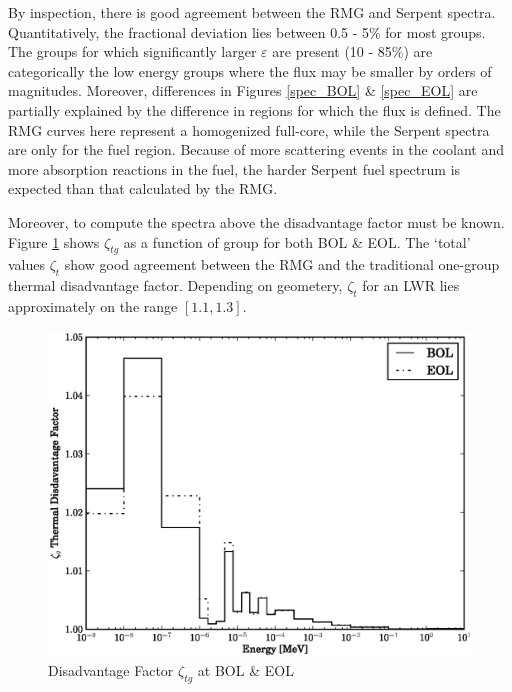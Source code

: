 By inspection, there is good agreement between the RMG and Serpent spectra.  Quantitatively, 
the fractional deviation lies between 0.5 - 5\% for most groups.  The groups for which 
significantly larger $\varepsilon$ are present (10 - 85\%) are categorically the low energy groups 
where the flux may be smaller by orders of magnitudes.  Moreover, differences in Figures \ref{spec_BOL} \& 
\ref{spec_EOL} are partially explained by the difference in regions for which the flux is defined.
The RMG curves here represent a homogenized full-core, while the Serpent spectra are only for the 
fuel region.  Because of more scattering events in the coolant and more absorption reactions in the fuel, 
the harder Serpent fuel spectrum is expected than that calculated by the RMG.

Moreover, to compute the spectra above the disadvantage factor must be known.
Figure \ref{zeta_BOL_EOL} shows $\zeta_{tg}$ as a function of group for both BOL \& EOL.
The `total' values $\zeta_t$ show good agreement between the RMG and the traditional one-group
thermal disadvantage factor.  Depending on geometery, $\zeta_t$ for an LWR lies approximately 
on the range $[1.1, 1.3]$.

\begin{figure}[htbp]
\caption{Disadvantage Factor $\zeta_{tg}$ at BOL \& EOL}
\label{zeta_BOL_EOL}
\begin{center}
\includegraphics[scale=0.5]{multigroup_method/figs/benchmark/zeta.eps}
\end{center}
\end{figure}


